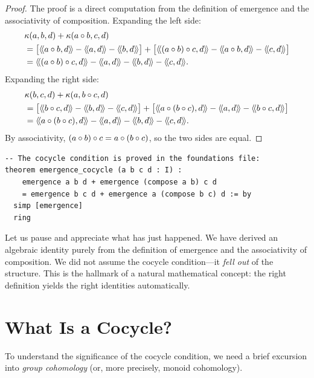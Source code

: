 \begin{proof}
The proof is a direct computation from the definition of emergence and the
associativity of composition. Expanding the left side:
\begin{align*}
&\emerge(a,b,d) + \emerge(a \compose b, c, d) \\
&= \bigl[\rs{a \compose b}{d} - \rs{a}{d} - \rs{b}{d}\bigr]
  + \bigl[\rs{(a \compose b) \compose c}{d} - \rs{a \compose b}{d} - \rs{c}{d}\bigr] \\
&= \rs{(a \compose b) \compose c}{d} - \rs{a}{d} - \rs{b}{d} - \rs{c}{d}.
\end{align*}
Expanding the right side:
\begin{align*}
&\emerge(b,c,d) + \emerge(a, b \compose c, d) \\
&= \bigl[\rs{b \compose c}{d} - \rs{b}{d} - \rs{c}{d}\bigr]
  + \bigl[\rs{a \compose (b \compose c)}{d} - \rs{a}{d} - \rs{b \compose c}{d}\bigr] \\
&= \rs{a \compose (b \compose c)}{d} - \rs{a}{d} - \rs{b}{d} - \rs{c}{d}.
\end{align*}
By associativity, $(a \circ b) \circ c = a \circ (b \circ c)$, so the
two sides are equal.
\end{proof}

\begin{lstlisting}[caption={The cocycle condition (IDT\_v3\_Foundations.lean)}]
-- The cocycle condition is proved in the foundations file:
theorem emergence_cocycle (a b c d : I) :
    emergence a b d + emergence (compose a b) c d
    = emergence b c d + emergence a (compose b c) d := by
  simp [emergence]
  ring
\end{lstlisting}

Let us pause and appreciate what has just happened. We have derived an
algebraic identity purely from the definition of emergence and the associativity
of composition. We did not assume the cocycle condition---it \emph{fell out}
of the structure. This is the hallmark of a natural mathematical concept:
the right definition yields the right identities automatically.


\section{What Is a Cocycle?}

To understand the significance of the cocycle condition, we need a brief excursion
into \emph{group cohomology} (or, more precisely, monoid cohomology).

